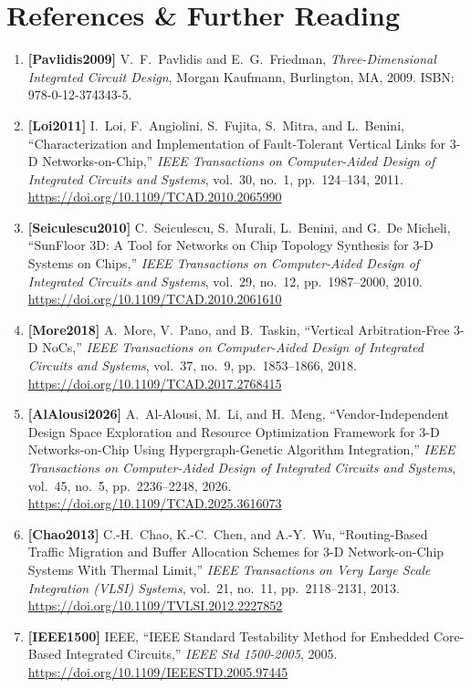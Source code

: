 \section{References \& Further Reading}
\label{sec:ch8_references}

\begin{enumerate}
    \item \textbf{[Pavlidis2009]} V.~F.~Pavlidis and E.~G.~Friedman, \emph{Three-Dimensional Integrated Circuit Design}, Morgan Kaufmann, Burlington, MA, 2009. ISBN: 978-0-12-374343-5.
    \item \textbf{[Loi2011]} I.~Loi, F.~Angiolini, S.~Fujita, S.~Mitra, and L.~Benini, ``Characterization and Implementation of Fault-Tolerant Vertical Links for 3-D Networks-on-Chip,'' \emph{IEEE Transactions on Computer-Aided Design of Integrated Circuits and Systems}, vol.~30, no.~1, pp.~124--134, 2011. \url{https://doi.org/10.1109/TCAD.2010.2065990}
    \item \textbf{[Seiculescu2010]} C.~Seiculescu, S.~Murali, L.~Benini, and G.~De Micheli, ``SunFloor 3D: A Tool for Networks on Chip Topology Synthesis for 3-D Systems on Chips,'' \emph{IEEE Transactions on Computer-Aided Design of Integrated Circuits and Systems}, vol.~29, no.~12, pp.~1987--2000, 2010. \url{https://doi.org/10.1109/TCAD.2010.2061610}
    \item \textbf{[More2018]} A.~More, V.~Pano, and B.~Taskin, ``Vertical Arbitration-Free 3-D NoCs,'' \emph{IEEE Transactions on Computer-Aided Design of Integrated Circuits and Systems}, vol.~37, no.~9, pp.~1853--1866, 2018. \url{https://doi.org/10.1109/TCAD.2017.2768415}
    \item \textbf{[AlAlousi2026]} A.~Al-Alousi, M.~Li, and H.~Meng, ``Vendor-Independent Design Space Exploration and Resource Optimization Framework for 3-D Networks-on-Chip Using Hypergraph-Genetic Algorithm Integration,'' \emph{IEEE Transactions on Computer-Aided Design of Integrated Circuits and Systems}, vol.~45, no.~5, pp.~2236--2248, 2026. \url{https://doi.org/10.1109/TCAD.2025.3616073}
    \item \textbf{[Chao2013]} C.-H.~Chao, K.-C.~Chen, and A.-Y.~Wu, ``Routing-Based Traffic Migration and Buffer Allocation Schemes for 3-D Network-on-Chip Systems With Thermal Limit,'' \emph{IEEE Transactions on Very Large Scale Integration (VLSI) Systems}, vol.~21, no.~11, pp.~2118--2131, 2013. \url{https://doi.org/10.1109/TVLSI.2012.2227852}
    \item \textbf{[IEEE1500]} IEEE, ``IEEE Standard Testability Method for Embedded Core-Based Integrated Circuits,'' \emph{IEEE Std 1500-2005}, 2005. \url{https://doi.org/10.1109/IEEESTD.2005.97445}

\end{enumerate}
